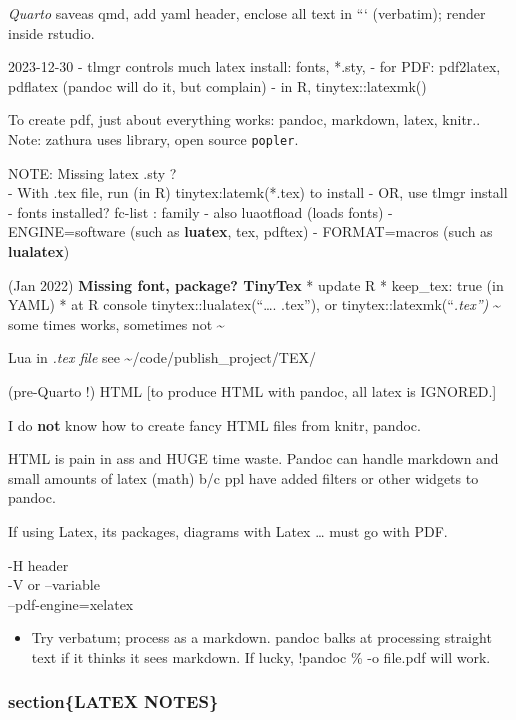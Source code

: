 \documentclass[
  letterpaper,
  DIV=11,
  numbers=noendperiod]{scrartcl}
\providecommand{\tightlist}{%
  \setlength{\itemsep}{0pt}\setlength{\parskip}{0pt}}\usepackage{longtable,booktabs,array}
\begin{document}
\emph{Quarto} saveas qmd, add yaml header, enclose all text in ```
(verbatim); render inside rstudio.

2023-12-30 - tlmgr controls much latex install: fonts, *.sty, - for PDF:
pdf2latex, pdflatex (pandoc will do it, but complain) - in R,
tinytex::latexmk()

To create pdf, just about everything works: pandoc, markdown, latex,
knitr.. Note: zathura uses library, open source \texttt{popler}.

NOTE: Missing latex .sty ?\\
- With .tex file, run (in R) tinytex:latemk(*.tex) to install - OR, use
tlmgr install - fonts installed? fc-list : family - also luaotfload
(loads fonts) - ENGINE=software (such as \textbf{luatex}, tex, pdftex) -
FORMAT=macros (such as \textbf{lualatex})

(Jan 2022) \textbf{Missing font, package? TinyTex} * update R *
keep\_tex: true (in YAML) * at R console tinytex::lualatex(``\ldots.
.tex''), or tinytex::latexmk(``\emph{.tex'') } \textasciitilde{} some
times works, sometimes not \textasciitilde{}

Lua in \emph{.tex file } see \textasciitilde/code/publish\_project/TEX/

(pre-Quarto !) HTML {[}to produce HTML with pandoc, all latex is
IGNORED.{]}

I do \textbf{not} know how to create fancy HTML files from knitr,
pandoc.

HTML is pain in ass and HUGE time waste. Pandoc can handle markdown and
small amounts of latex (math) b/c ppl have added filters or other
widgets to pandoc.

If using Latex, its packages, diagrams with Latex \ldots{} must go with
PDF.

-H header\\
-V or --variable\\
--pdf-engine=xelatex

\begin{itemize}
\tightlist
\item
  Try verbatum; process as a markdown. pandoc balks at processing
  straight text if it thinks it sees markdown. If lucky, !pandoc \% -o
  file.pdf will work.
\end{itemize}

\subsubsection{section\{LATEX NOTES\}}\label{sectionlatex-notes}
\end{document}
